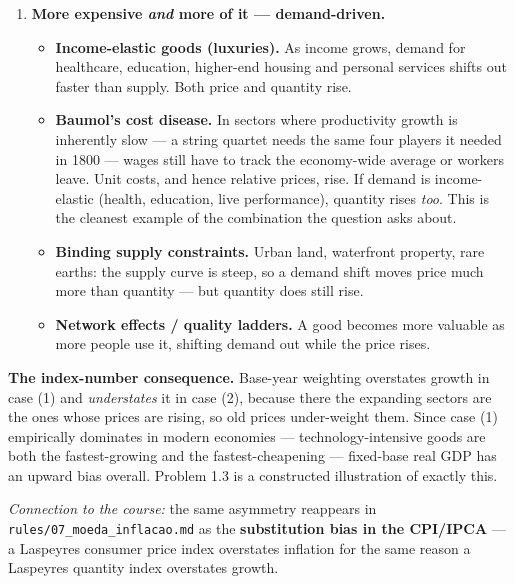 \documentclass[12pt, letterpaper]{article}
\begin{document}
\begin{tcolorbox}[oddbox,title={Problem 1.5 \quad Changes in Relative Prices}]
\begin{enumerate}
\item \textbf{More expensive \emph{and} more of it --- demand-driven.}

\begin{itemize}[leftmargin=1.3em,itemsep=3pt,topsep=2pt]
\item \textbf{Income-elastic goods (luxuries).} As income grows, demand for healthcare,
      education, higher-end housing and personal services shifts out faster than supply. Both
      price and quantity rise.
\item \textbf{Baumol's cost disease.} In sectors where productivity growth is inherently
      slow --- a string quartet needs the same four players it needed in 1800 --- wages
      still have to track the economy-wide average or workers leave. Unit costs, and hence
      relative prices, rise. If demand is income-elastic (health, education, live
      performance), quantity rises \emph{too}. This is the cleanest example of the
      combination the question asks about.
\item \textbf{Binding supply constraints.} Urban land, waterfront property, rare earths: the
      supply curve is steep, so a demand shift moves price much more than quantity --- but
      quantity does still rise.
\item \textbf{Network effects / quality ladders.} A good becomes more valuable as more people
      use it, shifting demand out while the price rises.
\end{itemize}

\end{enumerate}

\textbf{The index-number consequence.} Base-year weighting overstates growth in case (1) and
\emph{understates} it in case (2), because there the expanding sectors are the ones whose
prices are rising, so old prices under-weight them. Since case (1) empirically dominates in
modern economies --- technology-intensive goods are both the fastest-growing and the
fastest-cheapening --- fixed-base real GDP has an upward bias overall. Problem 1.3 is a
constructed illustration of exactly this.

\medskip
\emph{Connection to the course:} the same asymmetry reappears in
\texttt{rules/07\_moeda\_inflacao.md} as the \textbf{substitution bias in the CPI/IPCA} ---
a Laspeyres consumer price index overstates inflation for the same reason a Laspeyres
quantity index overstates growth.
\end{tcolorbox}

\end{document}

